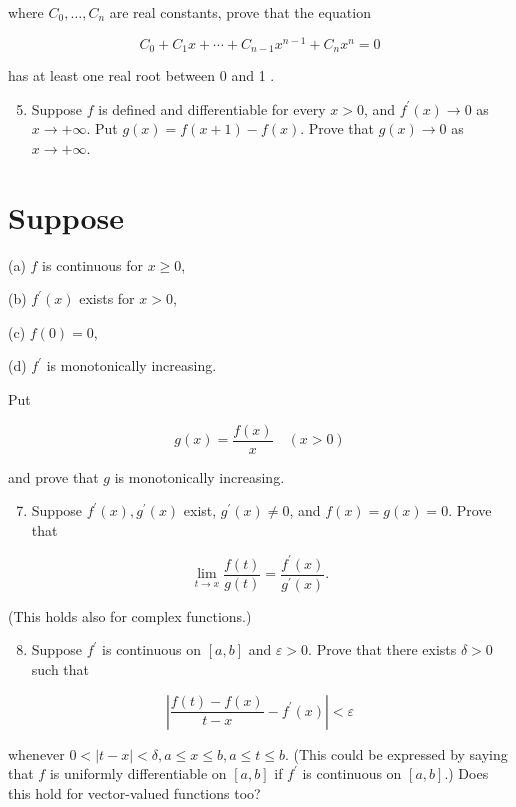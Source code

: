 \documentclass[10pt]{article}
\begin{document}
where $C_{0}, \ldots, C_{n}$ are real constants, prove that the equation

$$
C_{0}+C_{1} x+\cdots+C_{n-1} x^{n-1}+C_{n} x^{n}=0
$$

has at least one real root between 0 and 1 .

\begin{enumerate}
  \setcounter{enumi}{4}
  \item Suppose $f$ is defined and differentiable for every $x>0$, and $f^{\prime}(x) \rightarrow 0$ as $x \rightarrow+\infty$. Put $g(x)=f(x+1)-f(x)$. Prove that $g(x) \rightarrow 0$ as $x \rightarrow+\infty$.
\end{enumerate}

\section{Suppose}
(a) $f$ is continuous for $x \geq 0$,

(b) $f^{\prime}(x)$ exists for $x>0$,

(c) $f(0)=0$,

(d) $f^{\prime}$ is monotonically increasing.

Put

$$
g(x)=\frac{f(x)}{x} \quad(x>0)
$$

and prove that $g$ is monotonically increasing.

\begin{enumerate}
  \setcounter{enumi}{6}
  \item Suppose $f^{\prime}(x), g^{\prime}(x)$ exist, $g^{\prime}(x) \neq 0$, and $f(x)=g(x)=0$. Prove that
\end{enumerate}

$$
\lim _{t \rightarrow x} \frac{f(t)}{g(t)}=\frac{f^{\prime}(x)}{g^{\prime}(x)} .
$$

(This holds also for complex functions.)

\begin{enumerate}
  \setcounter{enumi}{7}
  \item Suppose $f^{\prime}$ is continuous on $[a, b]$ and $\varepsilon>0$. Prove that there exists $\delta>0$ such that
\end{enumerate}

$$
\left|\frac{f(t)-f(x)}{t-x}-f^{\prime}(x)\right|<\varepsilon
$$

whenever $0<|t-x|<\delta, a \leq x \leq b, a \leq t \leq b$. (This could be expressed by saying that $f$ is uniformly differentiable on $[a, b]$ if $f^{\prime}$ is continuous on $[a, b]$.) Does this hold for vector-valued functions too?
\end{document}
